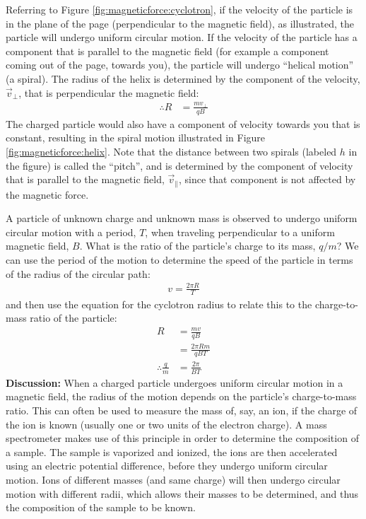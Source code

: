 Referring to Figure \ref{fig:magneticforce:cyclotron}, if the velocity of the particle is in the plane of the page (perpendicular to the magnetic field), as illustrated, the particle will undergo uniform circular motion. If the velocity of the particle has a component that is parallel to the magnetic field (for example a component coming out of the page, towards you), the particle will undergo ``helical motion'' (a spiral). The radius of the helix is determined by the component of the velocity, $\vec v_{\perp}$, that is perpendicular the magnetic field:
\begin{align*}
\therefore R &= \frac{mv_{\perp}}{qB}
\end{align*}
The charged particle would also have a component of velocity towards you that is constant, resulting in the spiral motion illustrated in Figure \ref{fig:magneticforce:helix}. Note that the distance between two spirals (labeled $h$ in the figure) is called the ``pitch'', and is determined by the component of velocity that is parallel to the magnetic field, $\vec v_\parallel$, since that component is not affected by the magnetic force. 
\begin{example}{\label{ex:magneticforce:massspec}A particle of unknown charge and unknown mass is observed to undergo uniform circular motion with a period, $T$, when traveling perpendicular to a uniform magnetic field, $B$. What is the ratio of the particle's charge to its mass, $q/m$? }
We can use the period of the motion to determine the speed of the particle in terms of the radius of the circular path:
\begin{align*}
v = \frac{2\pi R}{T}
\end{align*}
and then use the equation for the cyclotron radius to relate this to the charge-to-mass ratio of the particle:
\begin{align*}
R &= \frac{mv}{qB}\\
  &= \frac{2\pi R m}{qBT}\\
\therefore \frac{q}{m} &= \frac{2\pi}{BT} 
\end{align*}
\textbf{Discussion:} When a charged particle undergoes uniform circular motion in a magnetic field, the radius of the motion depends on the particle's charge-to-mass ratio. This can often be used to measure the mass of, say, an ion, if the charge of the ion is known (usually one or two units of the electron charge). A mass spectrometer makes use of this principle in order to determine the composition of a sample. The sample is vaporized and ionized, the ions are then accelerated using an electric potential difference, before they undergo uniform circular motion. Ions of different masses (and same charge) will then undergo circular motion with different radii, which allows their masses to be determined, and thus the composition of the sample to be known.
\end{example}

